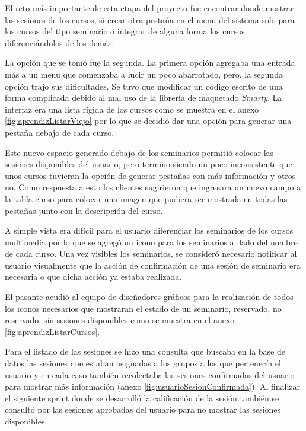	El reto más importante de esta etapa del proyecto fue encontrar donde mostrar las sesiones de los cursos, si crear otra pestaña en el menu del sistema solo para los cursos del tipo seminario o integrar de alguna forma los cursos diferenciándolos de los demás.

	La opción que se tomó fue la segunda. La primera opción agregaba una entrada más a un menu que comenzaba a lucir un poco abarrotado, pero, la segunda opción trajo sus dificultades. Se tuvo que modificar un código escrito de una forma complicada debido al mal uso de la librería de maquetado \emph{Smarty}. La interfaz era una lista rígida de los cursos como se muestra en el anexo \ref{fig:aprendizListarViejo} por lo que se decidió dar una opción para generar una pestaña debajo de cada curso.

	Este nuevo espacio generado debajo de los seminarios permitió colocar las sesiones disponibles del usuario, pero termino siendo un poco inconsistente que unos cursos tuvieran la opción de generar pestañas con más información y otros no. Como respuesta a esto los clientes sugirieron que ingresara un nuevo campo a la tabla curso para colocar una imagen que pudiera ser mostrada en todas las pestañas junto con la descripción del curso.

	A simple vista era difícil para el usuario diferenciar los seminarios de los cursos multimedia por lo que se agregó un icono para los seminarios al lado del nombre de cada curso. Una vez visibles los seminarios, se consideró necesario notificar al usuario visualmente que la acción de confirmación de una sesión de seminario era necesaria o que dicha acción ya estaba realizada.

	El pasante acudió al equipo de diseñadores gráficos para la realización de todos los iconos necesarios que mostraran el estado de un seminario, reservado, no reservado, sin sesiones disponibles como se muestra en el anexo \ref{fig:aprendizListarCursos}.

	Para el listado de las sesiones se hizo una consulta que buscaba en la base de datos las sesiones que estaban asignadas a los grupos a los que pertenecía el usuario y en cada caso también recolectaba las sesiones confirmadas del usuario para mostrar más información (anexo \ref{fig:usuarioSesionConfirmada}). Al finalizar el siguiente sprint donde se desarrolló la calificación de la sesión también se consultó por las sesiones aprobadas del usuario para no mostrar las sesiones disponibles.

